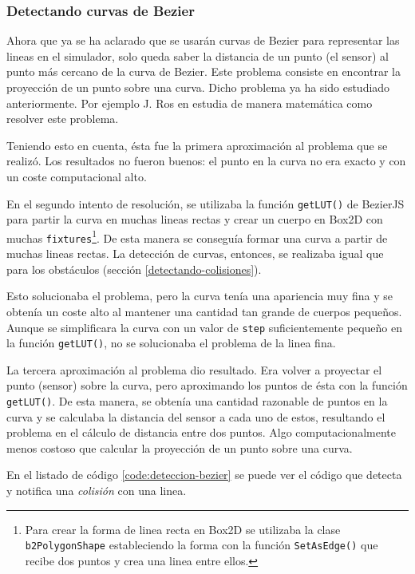 \subsubsection{Detectando curvas de Bezier}

Ahora que ya se ha aclarado que se usarán curvas de Bezier para representar las lineas en el simulador, solo queda saber la distancia de un punto (el sensor) al punto más cercano de la curva de Bezier. Este problema consiste en encontrar la proyección de un punto sobre una curva. Dicho problema ya ha sido estudiado anteriormente. Por ejemplo J. Ros en \cite{projection-point-bezier} estudia de manera matemática como resolver este problema. 

Teniendo esto en cuenta, ésta fue la primera aproximación al problema que se realizó. Los resultados no fueron buenos: el punto en la curva no era exacto y con un coste computacional alto.

En el segundo intento de resolución, se utilizaba la función \texttt{getLUT()} de BezierJS para partir la curva en muchas lineas rectas y crear un cuerpo en Box2D con muchas \texttt{fixtures}\footnote{Para crear la forma de linea recta en Box2D se utilizaba la clase \texttt{b2PolygonShape} estableciendo la forma con la función \texttt{SetAsEdge()} que recibe dos puntos y crea una linea entre ellos.}. De esta manera se conseguía formar una curva a partir de muchas lineas rectas. La detección de curvas, entonces, se realizaba igual que para los obstáculos (sección \ref{detectando-colisiones}).

Esto solucionaba el problema, pero la curva tenía una apariencia muy fina y se obtenía un coste alto al mantener una cantidad tan grande de cuerpos pequeños. Aunque se simplificara la curva con un valor de \texttt{step} suficientemente pequeño en la función \texttt{getLUT()}, no se solucionaba el problema de la linea fina.

La tercera aproximación al problema dio resultado. Era volver a proyectar el punto (sensor) sobre la curva, pero aproximando los puntos de ésta con la función \texttt{getLUT()}. De esta manera, se obtenía una cantidad razonable de puntos en la curva y se calculaba la distancia del sensor a cada uno de estos, resultando el problema en el cálculo de distancia entre dos puntos. Algo computacionalmente menos costoso que calcular la proyección de un punto sobre una curva. 

En el listado de código \ref{code:deteccion-bezier} se puede ver el código que detecta y notifica una \emph{colisión} con una linea. 

